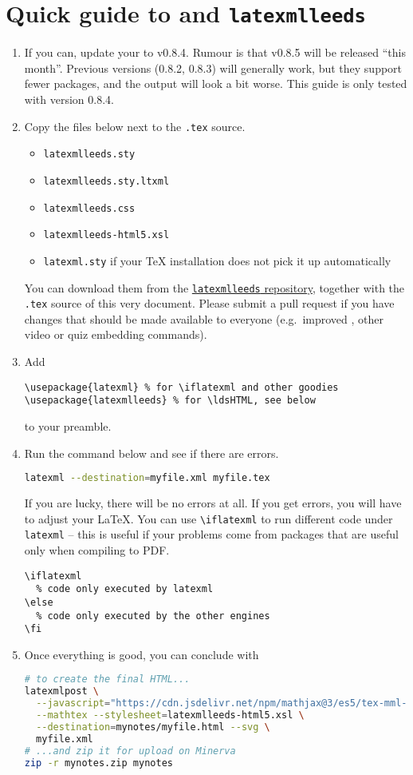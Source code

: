 \documentclass[a4paper]{article}
\def\ltxinline{\lstinline[style=latexml]}
\theoremstyle{definition}
\begin{document}
\tableofcontents

\section{Quick guide to \texorpdfstring{\LaTeXML{}}{LaTeXML} and \texttt{latexmlleeds}}
\begin{enumerate}
  \item If you can, update your \LaTeXML{} to v0.8.4. Rumour is that v0.8.5 will be released ``this month''. Previous versions (0.8.2, 0.8.3) will generally work, but they support fewer packages, and the output will look a bit worse. This guide is only tested with version 0.8.4.
  \item Copy the files below next to the \verb|.tex| source.
  \begin{itemize}
    \item \verb|latexmlleeds.sty|
    \item \verb|latexmlleeds.sty.ltxml|
    \item \verb|latexmlleeds.css|
    \item \verb|latexmlleeds-html5.xsl|
    \item \verb|latexml.sty| if your \TeX{} installation does not pick it up automatically
  \end{itemize}
  You can download them from the \href{https://dev.azure.com/pmtvlm-leeds-ac-uk/public/_git/latexmlleeds}{\texttt{latexmlleeds} repository}, together with the \verb|.tex| source of this very document. Please submit a pull request if you have changes that should be made available to everyone (e.g.\ improved \CSS{}, other video or quiz embedding commands).
  \item Add
  \begin{lstlisting}[style=latexml]
\usepackage{latexml} % for \iflatexml and other goodies
\usepackage{latexmlleeds} % for \ldsHTML, see below
  \end{lstlisting}
  to your preamble.
  \item Run the command below and see if there are errors.
  \begin{lstlisting}[language=bash]
latexml --destination=myfile.xml myfile.tex
  \end{lstlisting}
  If you are lucky, there will be no errors at all. If you get errors, you will have to adjust your \LaTeX{}. You can use \ltxinline|\iflatexml| to run different code under \verb|latexml| -- this is useful if your problems come from packages that are useful only when compiling to PDF.
  \begin{lstlisting}[style=latexml]
\iflatexml
  % code only executed by latexml
\else
  % code only executed by the other engines
\fi
  \end{lstlisting}
  \item Once everything is good, you can conclude with
  \begin{lstlisting}[language=bash]
# to create the final HTML...
latexmlpost \
  --javascript="https://cdn.jsdelivr.net/npm/mathjax@3/es5/tex-mml-chtml.js" \
  --mathtex --stylesheet=latexmlleeds-html5.xsl \
  --destination=mynotes/myfile.html --svg \
  myfile.xml
# ...and zip it for upload on Minerva
zip -r mynotes.zip mynotes


\end{lstlisting}
\end{enumerate}
\end{document}
